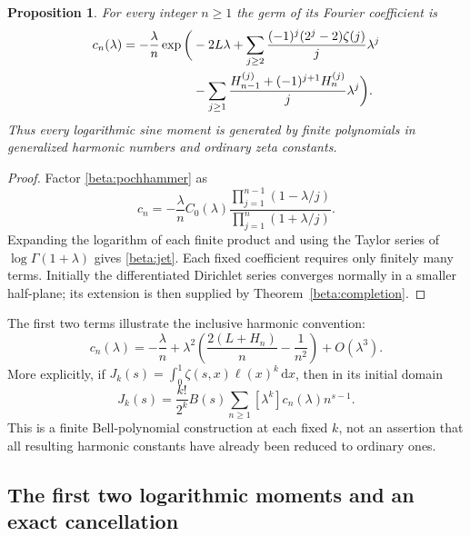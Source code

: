 \documentclass[11pt]{article}
\numberwithin{equation}{section}
\newtheorem{proposition}[theorem]{Proposition}
\theoremstyle{definition}
\theoremstyle{remark}
\newcommand{\dd}{\,\mathrm d}
\begin{document}
\begin{proposition}\label{beta:harmonicjets}
For every integer $n\geq1$ the germ of its Fourier coefficient is
\begin{align}\label{beta:jet}
 c_n(\lambda)=-\frac\lambda n\exp\bigg(&-2L\lambda
 +\sum_{j\geq2}\frac{(-1)^j(2^j-2)\zeta(j)}j\lambda^j\notag\\
 &-\sum_{j\geq1}
 \frac{H_{n-1}^{(j)}+(-1)^{j+1}H_n^{(j)}}j\lambda^j\bigg).
\end{align}
Thus every logarithmic sine moment is generated by finite polynomials
in generalized harmonic numbers and ordinary zeta constants.
\end{proposition}
\begin{proof}
Factor \eqref{beta:pochhammer} as
\[
 c_n=-\frac\lambda n C_0(\lambda)
  \frac{\prod_{j=1}^{n-1}(1-\lambda/j)}
       {\prod_{j=1}^{n}(1+\lambda/j)}.
\]
Expanding the logarithm of each finite product and using the Taylor
series of $\log\Gamma(1+\lambda)$ gives \eqref{beta:jet}.
Each fixed coefficient requires only finitely many terms. Initially
the differentiated Dirichlet series converges normally in a smaller
half-plane; its extension is then supplied by
Theorem~\ref{beta:completion}.
\end{proof}

The first two terms illustrate the inclusive harmonic convention:
\begin{equation}\label{beta:firstjets}
 c_n(\lambda)=-\frac\lambda n+\lambda^2
 \left(\frac{2(L+H_n)}n-\frac1{n^2}\right)+O(\lambda^3).
\end{equation}
More explicitly, if $J_k(s)=\int_0^1\zeta(s,x)\ell(x)^k\dd x$,
then in its initial domain
\begin{equation}\label{beta:belltransform}
 J_k(s)=\frac{k!}{2^k}B(s)
 \sum_{n\geq1}[\lambda^k]c_n(\lambda)n^{s-1}.
\end{equation}
This is a finite Bell-polynomial construction at each fixed $k$, not
an assertion that all resulting harmonic constants have already been
reduced to ordinary ones.

\subsection{The first two logarithmic moments and an exact cancellation}
\end{document}
